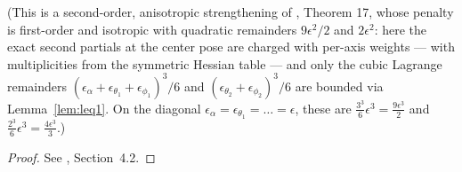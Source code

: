 \begin{theorem}
    (This is a second-order, anisotropic strengthening of
    \cite{polyhedron.without.rupert}, Theorem 17, whose penalty is first-order
    and isotropic with quadratic remainders $9\epsilon^2/2$ and $2\epsilon^2$:
    here the exact second partials at the center pose are charged with
    per-axis weights — with multiplicities from the symmetric Hessian table —
    and only the cubic Lagrange remainders
    $(\epsilon_\alpha+\epsilon_{\theta_1}+\epsilon_{\phi_1})^3/6$ and
    $(\epsilon_{\theta_2}+\epsilon_{\phi_2})^3/6$ are bounded via
    Lemma~\ref{lem:leq1}. On the diagonal
    $\epsilon_\alpha = \epsilon_{\theta_1} = \dots = \epsilon$, these are
    $\frac{3^3}{6}\epsilon^3 = \frac{9\epsilon^3}{2}$ and
    $\frac{2^3}{6}\epsilon^3 = \frac{4\epsilon^3}{3}$.)
\end{theorem}

\begin{proof}
\leanok
{}
See \cite{polyhedron.without.rupert}, Section~{4.2}.
\end{proof}

